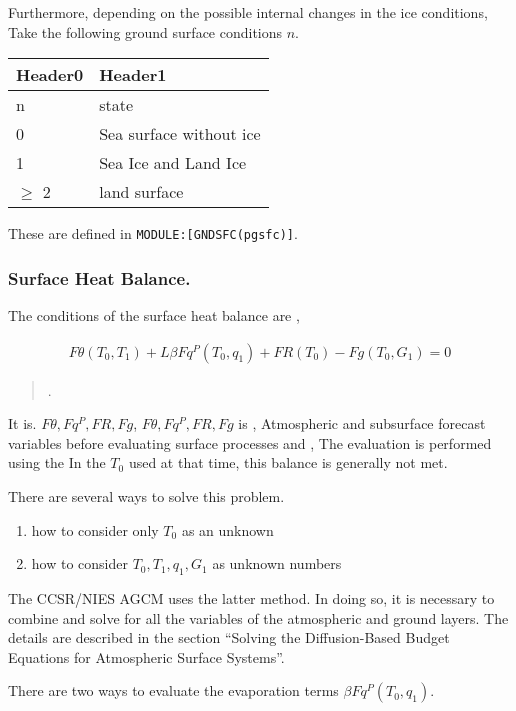 Furthermore, depending on the possible internal changes in the ice
conditions, Take the following ground surface conditions \(n\).

\begin{longtable}[]{@{}ll@{}}
\toprule
Header0 & Header1\tabularnewline
\midrule
\endhead
n & state\tabularnewline
0 & Sea surface without ice\tabularnewline
1 & Sea Ice and Land Ice\tabularnewline
\(\ge\) 2 & land surface\tabularnewline
\bottomrule
\end{longtable}

These are defined in \texttt{MODULE:{[}GNDSFC(pgsfc){]}}.

\hypertarget{surface-heat-balance.}{%
\subsubsection{Surface Heat Balance.}\label{surface-heat-balance.}}

The conditions of the surface heat balance are ,

\begin{eqnarray}
   F\theta(T_0,T_1) + L \beta Fq^P(T_0,q_1) + FR(T_0) - Fg(T_0,G_1) = 0
\end{eqnarray}

\begin{quote}
\protect\hypertarget{p-sfc:sfc-balance}{}{}.
\end{quote}

It is. \(F\theta, Fq^P, FR, Fg\), \(F\theta, Fq^P, FR, Fg\) is ,
Atmospheric and subsurface forecast variables before evaluating surface
processes and , The evaluation is performed using the In the \(T_0\)
used at that time, this balance is generally not met.

There are several ways to solve this problem.

\begin{enumerate}
\def\labelenumi{\arabic{enumi}.}
\item
  how to consider only \(T_0\) as an unknown
\item
  how to consider \(T_0,T_1,q_1,G_1\) as unknown numbers
\end{enumerate}

The CCSR/NIES AGCM uses the latter method. In doing so, it is necessary
to combine and solve for all the variables of the atmospheric and ground
layers. The details are described in the section ``Solving the
Diffusion-Based Budget Equations for Atmospheric Surface Systems''.

There are two ways to evaluate the evaporation terms
\(\beta Fq^P(T_0,q_1)\).

